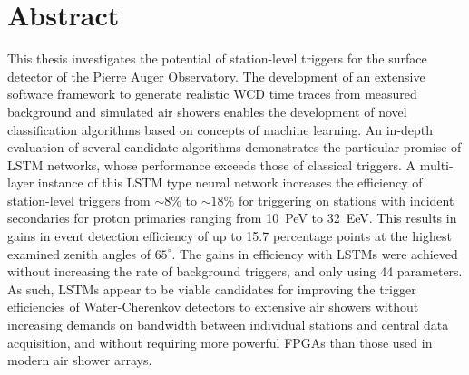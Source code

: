 
\chapter*{Abstract}

This thesis investigates the potential of station-level triggers for the surface detector of the Pierre Auger Observatory. The development of an extensive software
framework to generate realistic WCD time traces from measured background and simulated air showers enables the development of novel classification algorithms based
on concepts of machine learning. An in-depth evaluation of several candidate algorithms demonstrates the particular promise of LSTM networks, whose performance 
exceeds those of classical triggers. A multi-layer instance of this LSTM type neural network increases the efficiency of station-level triggers from $\sim8\%$ to 
$\sim18\%$ for triggering on stations with incident secondaries for proton primaries ranging from \SI{10}{\peta\electronvolt} to \SI{32}{\exa\electronvolt}. This 
results in gains in event detection efficiency of up to 15.7 percentage points at the highest examined zenith angles of $65^\circ$. The gains in efficiency with 
LSTMs were achieved without increasing the rate of background triggers, and only using 44 parameters. As such, LSTMs appear to be viable candidates for improving 
the trigger efficiencies of Water-Cherenkov detectors to extensive air showers without increasing demands on bandwidth between individual stations and central data
acquisition, and without requiring more powerful FPGAs than those used in modern air shower arrays. 